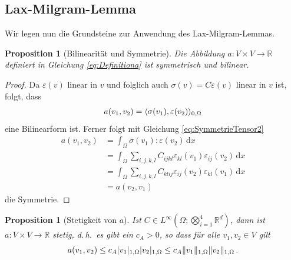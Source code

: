 \documentclass{scrartcl}
\newcounter{everything}
\newtheorem{proposition}[everything]{Proposition}
\def\R{\mathbb{R}}
\def\e{\varepsilon}
\newcommand{\dif}[1]{\,\mathrm{d} #1}
\DeclarePairedDelimiter{\abs}{\lvert}{\rvert}
\DeclarePairedDelimiter{\inner}{\langle}{\rangle}
\DeclarePairedDelimiter{\norm}{\lVert}{\rVert}
\begin{document}
\subsection{Lax-Milgram-Lemma}
Wir legen nun die Grundsteine zur Anwendung des Lax-Milgram-Lemmas.
\begin{proposition}[Bilinearität und Symmetrie]\label{pr:symmetrieBilineara}
	Die Abbildung $a\colon V\times V\to\R$ definiert in Gleichung \eqref{eq:Definitiona} ist symmetrisch und bilinear.
\end{proposition}
\begin{proof}
	Da $\e(v)$ linear in $v$ und folglich auch $\sigma(v)=C\e(v)$ linear in $v$ ist, folgt, dass
	\begin{align*}
		a(v_1,v_2) = \inner{\sigma(v_1),\e(v_2)}_{0,\Omega}
	\end{align*}
	eine Bilinearform ist. Ferner folgt mit Gleichung \eqref{eq:SymmetrieTensor2}
	\begin{align*}
		a(v_1,v_2) &= \int_\Omega\sigma(v_1):\e(v_2)\dif x \\
		&= \int_\Omega\sum_{i,j,k,l}C_{ijkl}\e_{kl}(v_1)\e_{ij}(v_2)\dif x \\
		&= \int_\Omega\sum_{i,j,k,l}C_{klij}\e_{ij}(v_2)\e_{kl}(v_1)\dif x \\
		&= a(v_2,v_1)
	\end{align*}
	die Symmetrie.
\end{proof}
\begin{proposition}[Stetigkeit von $a$]\label{pr:stetigkeita}
	Ist $C\in L^\infty(\Omega;\bigotimes_{i=1}^4\R^d)$, dann ist $a\colon V\times V\to\R$ stetig, d.\,h.\ es gibt ein $c_A>0$, so dass für alle $v_1,v_2\in V$ gilt
	\begin{align*}
		a(v_1,v_2)\leq c_A\abs{v_1}_{1,\Omega}\abs{v_2}_{1,\Omega}\leq c_A\norm{v_1}_{1,\Omega}\norm{v_2}_{1,\Omega} \,.
	\end{align*}
\end{proposition}
\end{document}
